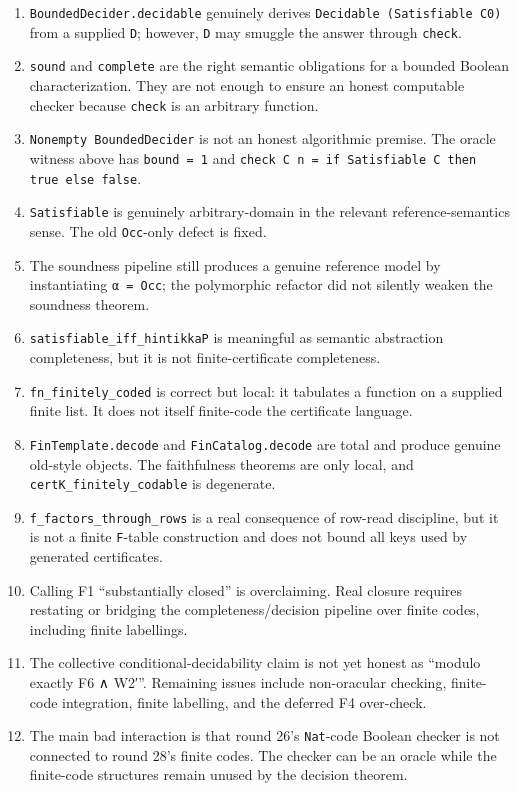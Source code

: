 \documentclass[11pt]{article}
\begin{document}
\begin{enumerate}
\item \texttt{BoundedDecider.decidable} genuinely derives \texttt{Decidable (Satisfiable C0)} from a supplied \texttt{D}; however, \texttt{D} may smuggle the answer through \texttt{check}.
\item \texttt{sound} and \texttt{complete} are the right semantic obligations for a bounded Boolean characterization. They are not enough to ensure an honest computable checker because \texttt{check} is an arbitrary function.
\item \texttt{Nonempty BoundedDecider} is not an honest algorithmic premise. The oracle witness above has \texttt{bound = 1} and \texttt{check C n = if Satisfiable C then true else false}.
\item \texttt{Satisfiable} is genuinely arbitrary-domain in the relevant reference-semantics sense. The old \texttt{Occ}-only defect is fixed.
\item The soundness pipeline still produces a genuine reference model by instantiating \texttt{α = Occ}; the polymorphic refactor did not silently weaken the soundness theorem.
\item \texttt{satisfiable\_iff\_hintikkaP} is meaningful as semantic abstraction completeness, but it is not finite-certificate completeness.
\item \texttt{fn\_finitely\_coded} is correct but local: it tabulates a function on a supplied finite list. It does not itself finite-code the certificate language.
\item \texttt{FinTemplate.decode} and \texttt{FinCatalog.decode} are total and produce genuine old-style objects. The faithfulness theorems are only local, and \texttt{certK\_finitely\_codable} is degenerate.
\item \texttt{f\_factors\_through\_rows} is a real consequence of row-read discipline, but it is not a finite \texttt{F}-table construction and does not bound all keys used by generated certificates.
\item Calling F1 ``substantially closed'' is overclaiming. Real closure requires restating or bridging the completeness/decision pipeline over finite codes, including finite labellings.
\item The collective conditional-decidability claim is not yet honest as ``modulo exactly F6 ∧ W2′''. Remaining issues include non-oracular checking, finite-code integration, finite labelling, and the deferred F4 over-check.
\item The main bad interaction is that round 26's \texttt{Nat}-code Boolean checker is not connected to round 28's finite codes. The checker can be an oracle while the finite-code structures remain unused by the decision theorem.
\end{enumerate}
\end{document}
